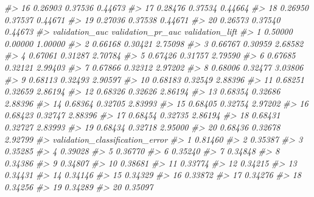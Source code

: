 \documentclass[]{book}
\newenvironment{Shaded}{\begin{snugshade}}{\end{snugshade}}
\newcommand{\CommentTok}[1]{\textcolor[rgb]{0.56,0.35,0.01}{\textit{#1}}}
\begin{document}
\begin{Shaded}
\begin{Highlighting}[]
\CommentTok{#> 16                       0.26903         0.37536            0.44673}
\CommentTok{#> 17                       0.28476         0.37534            0.44664}
\CommentTok{#> 18                       0.26950         0.37537            0.44671}
\CommentTok{#> 19                       0.27036         0.37538            0.44671}
\CommentTok{#> 20                       0.26573         0.37540            0.44673}
\CommentTok{#>    validation_auc validation_pr_auc validation_lift}
\CommentTok{#> 1         0.50000           0.00000         1.00000}
\CommentTok{#> 2         0.66168           0.30421         2.75098}
\CommentTok{#> 3         0.66767           0.30959         2.68582}
\CommentTok{#> 4         0.67061           0.31287         2.70784}
\CommentTok{#> 5         0.67426           0.31757         2.79590}
\CommentTok{#> 6         0.67685           0.32121         2.99403}
\CommentTok{#> 7         0.67866           0.32312         2.97202}
\CommentTok{#> 8         0.68006           0.32477         3.03806}
\CommentTok{#> 9         0.68113           0.32493         2.90597}
\CommentTok{#> 10        0.68183           0.32549         2.88396}
\CommentTok{#> 11        0.68251           0.32659         2.86194}
\CommentTok{#> 12        0.68326           0.32626         2.86194}
\CommentTok{#> 13        0.68354           0.32686         2.88396}
\CommentTok{#> 14        0.68364           0.32705         2.83993}
\CommentTok{#> 15        0.68405           0.32754         2.97202}
\CommentTok{#> 16        0.68423           0.32747         2.88396}
\CommentTok{#> 17        0.68454           0.32735         2.86194}
\CommentTok{#> 18        0.68431           0.32727         2.83993}
\CommentTok{#> 19        0.68434           0.32718         2.95000}
\CommentTok{#> 20        0.68436           0.32678         2.92799}
\CommentTok{#>    validation_classification_error}
\CommentTok{#> 1                          0.81460}
\CommentTok{#> 2                          0.35387}
\CommentTok{#> 3                          0.35285}
\CommentTok{#> 4                          0.39028}
\CommentTok{#> 5                          0.36770}
\CommentTok{#> 6                          0.35240}
\CommentTok{#> 7                          0.34848}
\CommentTok{#> 8                          0.34386}
\CommentTok{#> 9                          0.34807}
\CommentTok{#> 10                         0.38681}
\CommentTok{#> 11                         0.33774}
\CommentTok{#> 12                         0.34215}
\CommentTok{#> 13                         0.34431}
\CommentTok{#> 14                         0.34146}
\CommentTok{#> 15                         0.34329}
\CommentTok{#> 16                         0.33872}
\CommentTok{#> 17                         0.34276}
\CommentTok{#> 18                         0.34256}
\CommentTok{#> 19                         0.34289}
\CommentTok{#> 20                         0.35097}
\end{Highlighting}
\end{Shaded}
\end{document}
